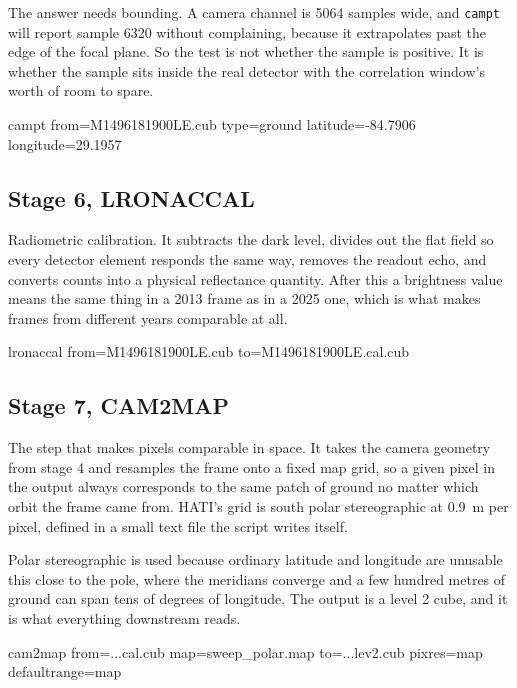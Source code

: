 \documentclass[11pt]{article}
\begin{document}
The answer needs bounding. A camera channel is 5064 samples wide, and \texttt{campt}
will report sample 6320 without complaining, because it extrapolates past the edge of
the focal plane. So the test is not whether the sample is positive. It is whether the
sample sits inside the real detector with the correlation window's worth of room to
spare.
\begin{cmdbox}\begin{cmdv}
campt from=M1496181900LE.cub type=ground latitude=-84.7906 longitude=29.1957
\end{cmdv}
\end{cmdbox}

\subsection{Stage 6, LRONACCAL}
Radiometric calibration. It subtracts the dark level, divides out the flat field so
every detector element responds the same way, removes the readout echo, and converts
counts into a physical reflectance quantity. After this a brightness value means the
same thing in a 2013 frame as in a 2025 one, which is what makes frames from
different years comparable at all.
\begin{cmdbox}\begin{cmdv}
lronaccal from=M1496181900LE.cub to=M1496181900LE.cal.cub
\end{cmdv}
\end{cmdbox}

\subsection{Stage 7, CAM2MAP}
The step that makes pixels comparable in space. It takes the camera geometry from
stage 4 and resamples the frame onto a fixed map grid, so a given pixel in the output
always corresponds to the same patch of ground no matter which orbit the frame came
from. HATI's grid is south polar stereographic at \SI{0.9}{\meter} per pixel, defined
in a small text file the script writes itself.

Polar stereographic is used because ordinary latitude and longitude are unusable this
close to the pole, where the meridians converge and a few hundred metres of ground
can span tens of degrees of longitude. The output is a level 2 cube, and it is what
everything downstream reads.
\begin{cmdbox}\begin{cmdv}
cam2map from=...cal.cub map=sweep_polar.map to=...lev2.cub pixres=map defaultrange=map
\end{cmdv}
\end{cmdbox}
\end{document}
